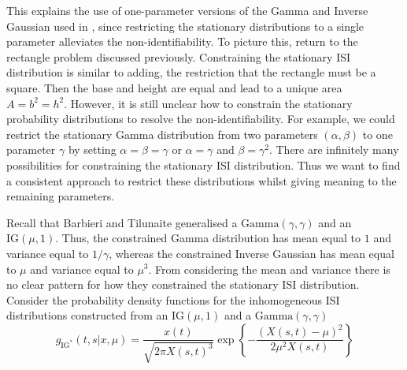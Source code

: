 \documentclass[oneside, 12 pt]{book}
\begin{document}
This explains the use of one-parameter versions of the Gamma and Inverse Gaussian used in \cite{Barbieri_2001, AGNE:1}, since restricting the stationary distributions to a single parameter alleviates the non-identifiability. To picture this, return to the rectangle problem discussed previously. Constraining the stationary ISI distribution is similar to adding, the restriction that the rectangle must be a square. Then the base and height are equal and lead to a unique area $A = b^2 = h^2$. However, it is still unclear how to constrain the stationary probability distributions to resolve the non-identifiability. For example, we could restrict the stationary Gamma distribution from two parameters $(\alpha, \beta)$ to one parameter $\gamma$ by setting $\alpha = \beta = \gamma $ or $\alpha =\gamma$ and $\beta =\gamma^2$. There are infinitely many possibilities for constraining the stationary ISI distribution.  Thus we want to find a consistent approach to restrict these distributions whilst giving meaning to the remaining parameters.  

Recall that Barbieri and Tilunaite generalised a $\mathrm{Gamma}(\gamma, \gamma)$ and an $\mathrm{IG}(\mu, 1)$. Thus, the constrained Gamma distribution has mean equal to $1$ and variance equal to $1/\gamma$, whereas the constrained Inverse Gaussian has mean equal to $\mu$ and variance equal to $\mu^3$. From considering the mean and variance there is no clear pattern for how they constrained the stationary ISI distribution. Consider the probability density functions for the inhomogeneous ISI distributions constructed from an $\mathrm{IG}(\mu, 1)$ and a $\mathrm{Gamma}(\gamma, \gamma)$
 \begin{equation} \label{eq:IGAgne}
 	  g_{\mathrm{IG^*}}(t,s| x,\mu) =  \frac{x(t)}{\sqrt{2\pi X(s,t)^3}} \exp  \left\{ -\frac{(X(s,t)-\mu)^2}{2 \mu^2 X(s,t)}\right\} 
 \end{equation}
\end{document}
